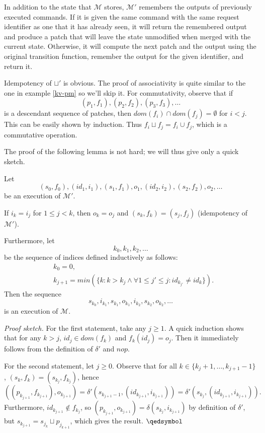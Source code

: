 \documentclass[12pt,a4paper,en]{pracamgr}
\newcommand{\ti}[1]{\textit{#1}}
\newcommand{\mc}[1]{\mathcal{#1}}
\begin{document}
In addition to the state that $\mc M$ stores, $\mc M'$ remembers the outputs of previously executed commands. If it is given the same command with the same request identifier as one that it has already seen, it will return the remembered output and produce a patch that will leave the state unmodified when merged with the current state. Otherwise, it will compute the next patch and the output using the original transition function, remember the output for the given identifier, and return it.

Idempotency of $\sqcup'$ is obvious. The proof of associativity is quite similar to the one in example \ref{kv-pm} so we'll skip it. For commutativity, observe that if
$$ (p_1, f_1), (p_2, f_2), (p_3, f_3), \dots $$
is a descendant sequence of patches, then $dom(f_i) \cap dom(f_j) = \emptyset$ for $i < j$. This can be easily shown by induction. Thus $f_i \sqcup f_j = f_i \cup f_j$, which is a commutative operation.

The proof of the following lemma is not hard; we will thus give only a quick sketch.

\begin{lemma}
    Let
    $$ (s_0, f_0), (id_1, i_1), (s_1, f_1), o_1, (id_2, i_2), (s_2, f_2), o_2, \dots $$
    be an execution of $\mc M'$.

    If $i_{k} = i_{j}$ for $1 \le j < k$, then $o_k = o_j$ and $(s_k, f_k) = (s_j, f_j)$ (idempotency of $\mc M'$).

    Furthermore, let
    $$ k_0, k_1, k_2, \dots $$
    be the sequence of indices defined inductively as follows:
    \begin{align*}
        & k_0 = 0,\\
        & k_{j+1} = min(\{k: k > k_j \land \forall 1 \le j' \le j: id_{k_{j'}} \neq id_k\}).
    \end{align*}
    Then the sequence
    $$ s_{k_0}, i_{k_1}, s_{k_1}, o_{k_1}, i_{k_2}, s_{k_2}, o_{k_2}, \dots $$
    is an execution of $\mc M$.
\end{lemma}
\ti{Proof sketch.} For the first statement, take any $j \ge 1$. A quick induction shows that for any $k > j$, $id_j \in dom(f_k)$ and $f_k(id_j) = o_j$. Then it immediately follows from the definition of $\delta'$ and $nop$.

For the second statement, let $j \ge 0$. Observe that for all $k \in \{k_j+1, \dots, k_{j+1}-1\}$, $(s_k, f_k) = (s_{k_j}, f_{k_j})$, hence
$$ ((p_{k_{j+1}}, f_{k_{j+1}}), o_{k_{j+1}}) = \delta'(s_{k_{j+1}-1}, (id_{k_{j+1}}, i_{k_{j+1}})) = \delta'(s_{k_j}, (id_{k_{j+1}}, i_{k_{j+1}})). $$
Furthermore, $id_{k_{j+1}} \notin f_{k_j}$, so $(p_{k_{j+1}}, o_{k_{j+1}}) = \delta(s_{k_j}, i_{k_{j+1}})$ by definition of $\delta'$, but $s_{k_{j+1}} = s_{j_k} \sqcup p_{j_{k+1}}$, which gives the result. $\qedsymbol$
\end{document}
